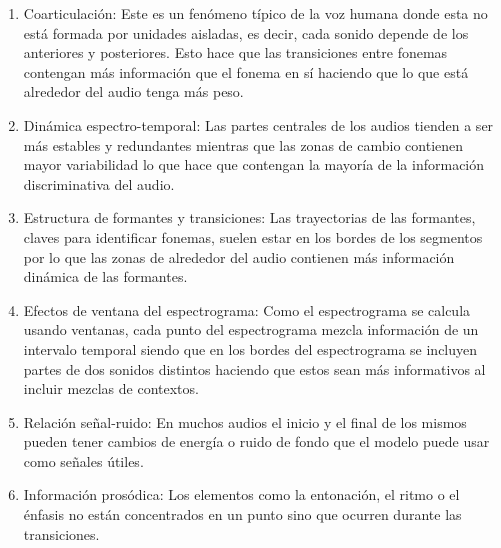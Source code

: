 \begin{enumerate}

 \item Coarticulación: Este es un fenómeno típico de la voz humana donde esta no está formada por unidades aisladas, es decir, cada sonido depende de los anteriores y posteriores. Esto hace que las transiciones entre fonemas contengan más información que el fonema en sí haciendo que lo que está alrededor del audio tenga más peso.
 
 \item Dinámica espectro-temporal: Las partes centrales de los audios tienden a ser más estables y redundantes mientras que las zonas de cambio contienen mayor variabilidad lo que hace que contengan la mayoría de la información discriminativa del audio.
 
 \item Estructura de formantes y transiciones: Las trayectorias de las formantes, claves para identificar fonemas, suelen estar en los bordes de los segmentos por lo que las zonas de alrededor del audio contienen más información 	dinámica de las formantes.
 
 \item Efectos de ventana del espectrograma: Como el espectrograma se calcula usando ventanas, cada punto del espectrograma mezcla información de un intervalo temporal siendo que en los bordes del espectrograma se incluyen partes de dos sonidos distintos haciendo que estos sean más informativos al incluir mezclas de contextos.
 
 \item Relación señal-ruido: En muchos audios el inicio y el final de los mismos pueden tener cambios de energía o ruido de fondo que el modelo puede usar como señales útiles.
 
 \item Información prosódica: Los elementos como la entonación, el ritmo o el énfasis no están concentrados en un punto sino que ocurren durante las transiciones.

\end{enumerate}